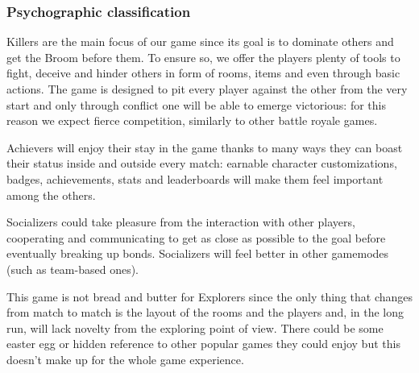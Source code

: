 \subsubsection{Psychographic classification}


Killers are the main focus of our game since its goal is to dominate others and get the Broom before them. To ensure so, we offer the players plenty of tools to fight, deceive and hinder others in form of rooms, items and even through basic actions. The game is designed to pit every player against the other from the very start and only through conflict one will be able to emerge victorious: for this reason we expect fierce competition, similarly to other battle royale games.

Achievers will enjoy their stay in the game thanks to many ways they can boast their status inside and outside every match: earnable character customizations, badges, achievements, stats and leaderboards will make them feel important among the others.

Socializers could take pleasure from the interaction with other players, cooperating and communicating to get as close as possible to the goal before eventually breaking up bonds. Socializers will feel better in other gamemodes (such as team-based ones).

This game is not bread and butter for Explorers since the only thing that changes from match to match is the layout of the rooms and the players and, in the long run, will lack novelty from the exploring point of view. There could be some easter egg or hidden reference to other popular games they could enjoy but this doesn't make up for the whole game experience.
